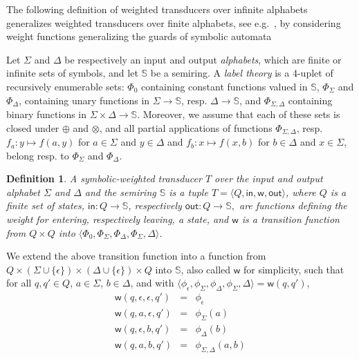 \documentclass[a4paper,11pt]{article}
\newtheorem{definition}[theorem]{Definition}
\def\<#1>{\langle #1 \rangle}
\newcommand{\Semiring}{\mathbb{S}}
\def\wei{\mathsf{w}}
\def\init{\mathsf{in}}
\def\final{\mathsf{out}}
\begin{document}
The following definition of weighted transducers over infinite alphabets 
generalizes weighted transducers over finite alphabets, see  e.g.~\cite{Mohri03EDWA}, 
by considering weight functions generalizing the guards of symbolic automata

Let $\Sigma$ and $\Delta$ be respectively an input and output \emph{alphabets}, 
which are finite or infinite sets of symbols, and let $\Semiring$ be a semiring.
%
A \emph{label theory} 
is a 4-uplet of recursively enumerable sets:
$\Phi_0$ containing constant functions valued in $\Semiring$, 
$\Phi_\Sigma$ and $\Phi_\Delta$, 
containing unary functions in $\Sigma \to \Semiring$, resp. $\Delta \to \Semiring$, 
and $\Phi_{\Sigma, \Delta}$  containing binary functions in $\Sigma \times \Delta \to \Semiring$.
Moreover, we assume that each of these sets is closed under $\oplus$ and $\otimes$, 
and all partial applications of functions $\Phi_{\Sigma, \Delta}$, 
resp. 
$f_a: y \mapsto f(a, y)$ for $a \in \Sigma$ and $y \in \Delta$
and 
$f_b: x \mapsto f(x, b)$ for $b \in \Delta$ and $x \in \Sigma$, 
belong resp. to $\Phi_\Sigma$ and $\Phi_\Delta$.

\begin{definition}
A \emph{symbolic-weighted transducer} $T$ over the input and output alphabet $\Sigma$ and $\Delta$ 
and the semiring $\Semiring$ is a tuple
$T = \< Q, \init, \wei, \final >$,
where $Q$ is a finite set of states, 
$\mathsf{in} : Q \to \Semiring$, 
respectively $\mathsf{out} : Q \to \Semiring,$
are functions defining the weight for entering, 
respectively leaving, a state, 
and $\wei$ is a transition %
function from $Q \times Q$ into %
$\< \Phi_0, \Phi_\Sigma, \Phi_\Delta, \Phi_{\Sigma, \Delta}>$.
\end{definition}
%
We extend the above transition function into a function from
$Q \times (\Sigma \cup \{ \epsilon \}) \times (\Delta \cup \{ \epsilon \}) \times Q$
into $\Semiring$, also called $\wei$ for simplicity, such that 
for all $q, q' \in Q$, $a \in \Sigma$, $b \in \Delta$, 
and with 
$\< \phi_\epsilon, \phi_\Sigma, \phi_\Delta, \phi_{\Sigma, \Delta}> = \wei(q, q')$, 
\[
\begin{array}{rcl}
\wei(q, \epsilon, \epsilon, q') & = & \phi_\epsilon\\
\wei(q, a, \epsilon, q') & = & \phi_\Sigma(a)\\
\wei(q, \epsilon, b, q') & = & \phi_\Delta(b)\\
\wei(q, a, b, q') & = & \phi_{\Sigma, \Delta}(a, b)
\end{array}      
\]
\end{document}
